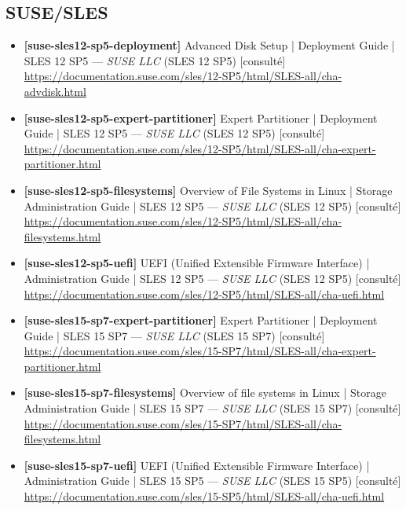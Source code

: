 \documentclass[10pt,a4paper]{article}
\begin{document}
\subsection{SUSE/SLES}
\begin{itemize}[leftmargin=1.6em]
\item \textbf{[suse-sles12-sp5-deployment]} Advanced Disk Setup | Deployment Guide | SLES 12 SP5 --- \textit{SUSE LLC} (SLES 12 SP5) \textcolor{cOk}{[consult\'e]}\\ \url{https://documentation.suse.com/sles/12-SP5/html/SLES-all/cha-advdisk.html}
\item \textbf{[suse-sles12-sp5-expert-partitioner]} Expert Partitioner | Deployment Guide | SLES 12 SP5 --- \textit{SUSE LLC} (SLES 12 SP5) \textcolor{cOk}{[consult\'e]}\\ \url{https://documentation.suse.com/sles/12-SP5/html/SLES-all/cha-expert-partitioner.html}
\item \textbf{[suse-sles12-sp5-filesystems]} Overview of File Systems in Linux | Storage Administration Guide | SLES 12 SP5 --- \textit{SUSE LLC} (SLES 12 SP5) \textcolor{cOk}{[consult\'e]}\\ \url{https://documentation.suse.com/sles/12-SP5/html/SLES-all/cha-filesystems.html}
\item \textbf{[suse-sles12-sp5-uefi]} UEFI (Unified Extensible Firmware Interface) | Administration Guide | SLES 12 SP5 --- \textit{SUSE LLC} (SLES 12 SP5) \textcolor{cOk}{[consult\'e]}\\ \url{https://documentation.suse.com/sles/12-SP5/html/SLES-all/cha-uefi.html}
\item \textbf{[suse-sles15-sp7-expert-partitioner]} Expert Partitioner | Deployment Guide | SLES 15 SP7 --- \textit{SUSE LLC} (SLES 15 SP7) \textcolor{cOk}{[consult\'e]}\\ \url{https://documentation.suse.com/sles/15-SP7/html/SLES-all/cha-expert-partitioner.html}
\item \textbf{[suse-sles15-sp7-filesystems]} Overview of file systems in Linux | Storage Administration Guide | SLES 15 SP7 --- \textit{SUSE LLC} (SLES 15 SP7) \textcolor{cOk}{[consult\'e]}\\ \url{https://documentation.suse.com/sles/15-SP7/html/SLES-all/cha-filesystems.html}
\item \textbf{[suse-sles15-sp7-uefi]} UEFI (Unified Extensible Firmware Interface) | Administration Guide | SLES 15 SP5 --- \textit{SUSE LLC} (SLES 15 SP5) \textcolor{cOk}{[consult\'e]}\\ \url{https://documentation.suse.com/sles/15-SP5/html/SLES-all/cha-uefi.html}

\end{itemize}
\end{document}
